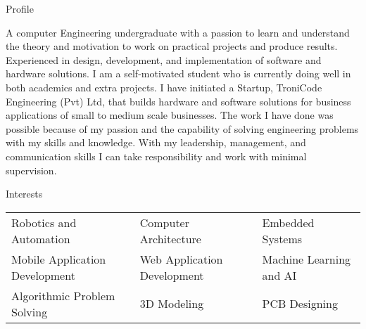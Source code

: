 \documentclass{resume} %
\begin{document}

\begin{rSection}{Profile}
\begin{rSubsection}{}{}{}{}
A computer Engineering undergraduate with a passion to learn and understand the theory and motivation to work on practical projects and produce results.  Experienced in design, development, and implementation of software and hardware solutions.  I am a self-motivated student who is currently doing well in both academics and extra projects. I have initiated a Startup, TroniCode Engineering (Pvt) Ltd, that builds hardware and software solutions for business applications of small to medium scale businesses.  The work I have done was possible because of my passion and the capability of solving engineering problems with my skills and knowledge.  With my leadership, management, and communication skills I can take responsibility and work with minimal supervision.

\end{rSubsection}
\end{rSection}



\begin{rSection}{Interests}
\begin{tabular}{l l l} 
Robotics and Automation & Computer Architecture & Embedded Systems \\
Mobile Application Development & Web Application Development & Machine Learning and AI \\
Algorithmic Problem Solving & 3D Modeling & PCB Designing
\end{tabular}


\end{rSection}
\end{document}
